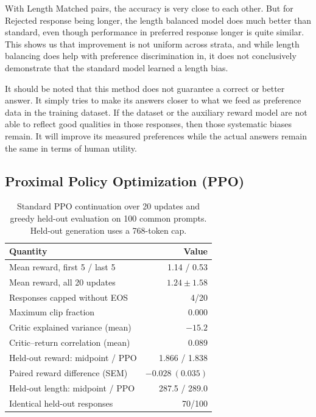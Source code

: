 \documentclass{article}
\begin{document}
With Length Matched pairs, the accuracy is very close to each other. But for Rejected response being longer, the length balanced model does much better than standard, even though performance in preferred response longer is quite similar. This shows us that improvement is not uniform across strata, and while
length balancing does help with preference discrimination in, it does not conclusively demonstrate that the standard model learned a length bias.

It should be noted that this method does not guarantee a correct or better answer. It simply tries to make its answers closer to what we feed as preference data in the training dataset.
If the dataset or the auxiliary reward model are not able to reflect good qualities in those responses, then those systematic biases remain. It will improve its measured preferences while the actual answers remain the same in terms of human utility.

\subsection{Proximal Policy Optimization (PPO)}


\begin{table}[t]
    \centering
    \small
    \setlength{\tabcolsep}{4pt}
    \begin{tabular}{lr}
        \toprule
        Quantity & Value \\
        \midrule
        Mean reward, first 5 / last 5 & 1.14 / 0.53 \\
        Mean reward, all 20 updates & $1.24 \pm 1.58$ \\
        Responses capped without EOS & 4/20 \\
        Maximum clip fraction & 0.000 \\
        Critic explained variance (mean) & $-15.2$ \\
        Critic--return correlation (mean) & 0.089 \\
        \midrule
        Held-out reward: midpoint / PPO & 1.866 / 1.838 \\
        Paired reward difference (SEM) & $-0.028\ (0.035)$ \\
        Held-out length: midpoint / PPO & 287.5 / 289.0 \\
        Identical held-out responses & 70/100 \\
        \bottomrule
    \end{tabular}
    \caption{Standard PPO continuation over 20 updates and greedy
    held-out evaluation on 100 common prompts. Held-out generation
    uses a 768-token cap.}
    \label{tab:ppo-standard}
\end{table}
\end{document}
